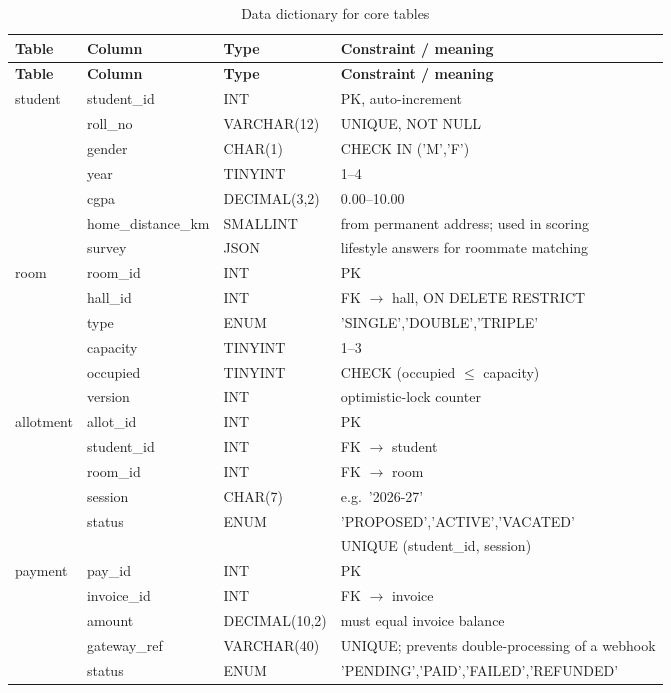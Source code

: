\documentclass[11pt,a4paper]{report}
\begin{document}
\begin{longtable}{p{2.3cm}p{3.1cm}p{2.6cm}p{6.5cm}}
\caption{Data dictionary for core tables}\label{tab:dd}\\
\toprule
\textbf{Table} & \textbf{Column} & \textbf{Type} & \textbf{Constraint / meaning}\\
\midrule\endfirsthead
\toprule
\textbf{Table} & \textbf{Column} & \textbf{Type} & \textbf{Constraint / meaning}\\
\midrule\endhead
\textsf{student} & student\_id & INT & PK, auto-increment\\
 & roll\_no & VARCHAR(12) & UNIQUE, NOT NULL\\
 & gender & CHAR(1) & CHECK IN ('M','F')\\
 & year & TINYINT & 1--4\\
 & cgpa & DECIMAL(3,2) & 0.00--10.00\\
 & home\_distance\_km & SMALLINT & from permanent address; used in scoring\\
 & survey & JSON & lifestyle answers for roommate matching\\
\midrule
\textsf{room} & room\_id & INT & PK\\
 & hall\_id & INT & FK $\rightarrow$ hall, ON DELETE RESTRICT\\
 & type & ENUM & 'SINGLE','DOUBLE','TRIPLE'\\
 & capacity & TINYINT & 1--3\\
 & occupied & TINYINT & CHECK (occupied $\le$ capacity)\\
 & version & INT & optimistic-lock counter\\
\midrule
\textsf{allotment} & allot\_id & INT & PK\\
 & student\_id & INT & FK $\rightarrow$ student\\
 & room\_id & INT & FK $\rightarrow$ room\\
 & session & CHAR(7) & e.g.\ '2026-27'\\
 & status & ENUM & 'PROPOSED','ACTIVE','VACATED'\\
 & & & UNIQUE (student\_id, session)\\
\midrule
\textsf{payment} & pay\_id & INT & PK\\
 & invoice\_id & INT & FK $\rightarrow$ invoice\\
 & amount & DECIMAL(10,2) & must equal invoice balance\\
 & gateway\_ref & VARCHAR(40) & UNIQUE; prevents double-processing of a webhook\\
 & status & ENUM & 'PENDING','PAID','FAILED','REFUNDED'\\
\bottomrule
\end{longtable}
\end{document}

